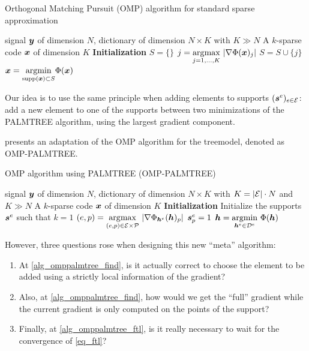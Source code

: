 \begin{algorithm}[!ht]
    \caption{Orthogonal Matching Pursuit (OMP) algorithm for standard sparse approximation}\label{alg_omp}
  \begin{algorithmic}[1]
    \Input signal $\bm{y}$ of dimension $N$, dictionary of dimension $N \times K$ with $K \gg N$
    \Output A $k$-sparse code $\bm{x}$ of dimension $K$
    \State \textbf{Initialization} $S=\{\}$
      \State $j =  \underset{j = 1,\dots,K}{\operatorname*{\arg\!\max}}~| \nabla \Phi(\bm{x})_j |$\label{alg_omp_pick_correlation}
      \State $S = S \cup \{j\}$
      \State $\bm{x} = \underset{\text{supp}(\bm{x}) \subset S}{\operatorname{argmin}} \Phi(\bm{x})$
    \EndFor
  \end{algorithmic}
\end{algorithm}

Our idea is to use the same principle when adding elements to supports $(\bm{s}^e)_{e \in \mathcal E}$: add a new element to one of the supports between two minimizations of the \ac{PALMTREE} algorithm, using the largest gradient component.

\noindent
{} presents an adaptation of the \ac{OMP} algorithm for the \gls{treemodel}, denoted as OMP-PALMTREE.

\begin{algorithm}[!ht]
    \caption{\ac{OMP} algorithm using \ac{PALMTREE} (OMP-PALMTREE)}\label{alg_omppalmtree}
  \begin{algorithmic}[1]
    \Input signal $\bm{y}$ of dimension $N$, dictionary of dimension $N \times K$ with $K = |\mathcal E| \cdot N$ and $K \gg N$
    \Output A $k$-sparse code $\bm{x}$ of dimension $K$
    \State \textbf{Initialization} Initialize the supports $\bm{s}^e$ such that $k=1$
      \State $(e,p) = \underset{(e,p) \in \mathcal E \times \mathcal P}{\operatorname*{\arg\!\max}}~ |\nabla \Phi_{\bm{h}^e}(\bm{h})_p|$\label{alg_omppalmtree_find}
      \State $\bm{s}^e_p = 1$
      \State $\bm{h} = \underset{\bm{h}^e \in {\mathcal D}^e}{\operatorname{argmin}}~ \Phi(\bm{h})$ \label{alg_omppalmtree_ftl}
    \EndFor
  \end{algorithmic}
\end{algorithm}

\noindent
However, three questions rose when designing this new “meta” algorithm:
\begin{enumerate}[label={\alph*)},noitemsep]
	\item At \cref{alg_omppalmtree_find}, is it actually correct to choose the element to be added using a strictly local information of the gradient?
	\item Also, at \cref{alg_omppalmtree_find}, how would we get the “full” gradient while the current gradient is only computed on the points of the support?
	\item Finally, at \cref{alg_omppalmtree_ftl}, is it really necessary to wait for the convergence of \eqref{eq_ftl}?
\end{enumerate}

